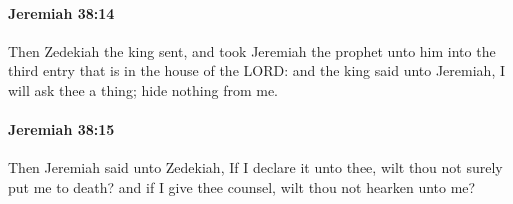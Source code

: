 		\paragraph{Jeremiah 38:14} %
			\label{JEREMIAH-38-14}

			Then Zedekiah the king sent, and took Jeremiah the prophet unto him into the third entry that is in the house of the LORD: and the king said unto Jeremiah, I will ask thee a thing; hide nothing from me.


		\paragraph{Jeremiah 38:15} %
			\label{JEREMIAH-38-15}

			Then Jeremiah said unto Zedekiah, If I declare it unto thee, wilt thou not surely put me to death? and if I give thee counsel, wilt thou not hearken unto me?

